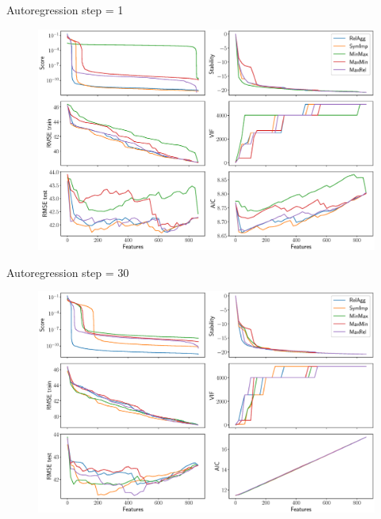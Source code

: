 \documentclass[9pt]{beamer}
\begin{document}
\begin{frame}{Autoregression step = 1}
	\begin{figure}
		\includegraphics[width=\linewidth]{figs/ecog_3_1_metrics.eps}
	\end{figure}
\end{frame}
\begin{frame}{Autoregression step = 30}
	\begin{figure}
		\includegraphics[width=\linewidth]{figs/ecog_3_15_metrics.eps}
	\end{figure}
\end{frame}
\begin{frame}{}
\end{frame}
\end{document}
